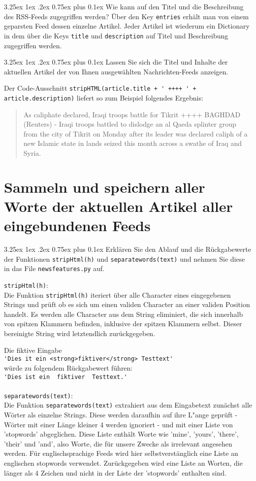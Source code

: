 \documentclass[12pt,a4paper]{scrartcl}
\makeatletter
\renewcommand\subparagraph{\@startsection{subparagraph}{5}{\parindent}%
    {3.25ex \@plus1ex \@minus .2ex}%
    {0.75ex plus 0.1ex}%
    {\normalfont\normalsize\bfseries}}
\makeatother
\begin{document}
\subparagraph{Wie kann auf den Titel und die Beschreibung des RSS-Feeds zugegriffen werden?}
\"Uber den Key \lstinline{entries} erh\"alt man von einem geparsten Feed dessen einzelne Artikel. Jeder Artikel ist wiederum ein Dictionary in dem \"uber die Keys \lstinline|title| und \lstinline|description| auf Titel und Beschreibung zugegriffen werden.

\subparagraph{Lassen Sie sich die Titel und Inhalte der aktuellen Artikel der von Ihnen ausgew\"ahlten Nachrichten-Feeds anzeigen.}

Der Code-Ausschnitt \lstinline|stripHTML(article.title + ' ++++ ' + article.description)| liefert so zum Beispiel folgendes Ergebnis:

\begin{quote}
As caliphate declared, Iraqi troops battle for Tikrit ++++ BAGHDAD (Reuters) - Iraqi troops battled to dislodge an al Qaeda splinter group from the city of Tikrit on Monday after its leader was declared caliph of a new Islamic state in lands seized this month across a swathe of Iraq and Syria.  
\end{quote}
        
\section*{Sammeln und speichern aller Worte der aktuellen Artikel aller eingebundenen Feeds}
\subparagraph{Erkl\"aren Sie den Ablauf und die R\"uckgabewerte der Funktionen \lstinline|stripHtml(h)| und \lstinline|separatewords(text)| und nehmen Sie diese in das File \lstinline|newsfeatures.py| auf.}

\lstinline|stripHtml(h)|:\\
Die Funktion \lstinline|stripHtml(h)| iteriert \"uber alle Character eines eingegebenen Strings und pr\"uft ob es sich um einen validen Character an einer validen Position handelt. Es werden alle Character aus dem String eliminiert, die sich innerhalb von spitzen Klammern befinden, inklusive der spitzen Klammern selbst. 
Dieser bereinigte String wird letztendlich zur\"uckgegeben.

Die fiktive Eingabe \\\lstinline|'Dies it ein <strong>fiktiver</strong> Testtext'| \\w\"urde zu folgendem R\"uckgabewert f\"uhren:\\ \lstinline{'Dies ist ein  fiktiver  Testtext.'}
\\\\
\lstinline|separatewords(text)|:\\
Die Funktion \lstinline|separatewords(text)| extrahiert aus dem Eingabetext zun\"achst alle W\"orter als einzelne Strings. Diese werden daraufhin auf ihre L"ange gepr\"uft - W\"orter mit einer L\"ange kleiner 4 werden ignoriert - und mit einer Liste von 'stopwords' abgeglichen. Diese Liste enth\"alt Worte wie 'mine', 'yours', 'there', 'their' und 'and', also Worte, die f\"ur unsere Zwecke als irrelevant angesehen werden. F\"ur englischsprachige Feeds wird hier selbstverst\"anglich eine Liste an englischen stopwords verwendet. 
Zur\"uckgegeben wird eine Liste an Worten, die l\"anger als 4 Zeichen und nicht in der Liste der 'stopwords' enthalten sind.
\end{document}
